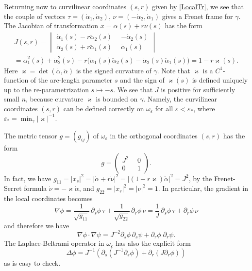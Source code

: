 \documentclass[reqno]{amsart}
\theoremstyle{plain}
\numberwithin{equation}{section}
\renewcommand{\kappa}{\varkappa}
\newcommand{\eps}{\varepsilon}
\begin{document}
Returning now to curvilinear coordinates $(s,r)$ given by \eqref{LocalTr},
we see that the couple of vectors
$ \tau=(\dot{\alpha}_1, \dot{\alpha}_2)$, $\nu=(-\dot{\alpha}_2, \dot{\alpha}_1)$
gives a Frenet frame for $\gamma$.
The Jacobian of transformation $x=\alpha(s)+r\nu(s)$ has the form
\begin{multline*}
J(s,r)=
\begin{vmatrix}
  \dot{\alpha}_1(s)-r\ddot{\alpha}_2(s)& -\dot{\alpha}_2(s)\\
          \dot{\alpha}_2(s)+r\ddot{\alpha}_1(s)\phantom{0} & \dot{\alpha}_1(s)
\end{vmatrix}
\\
=\dot{\alpha}_1^2(s)+\dot{\alpha}_2^2(s)
-r\big(\dot{\alpha}_1(s)\ddot{\alpha}_2(s)-
  \dot{\alpha}_2(s)\ddot{\alpha}_1(s)\big)=1-r \kappa(s).
\end{multline*}
Here $\kappa=\det(\dot{\alpha},\ddot{\alpha})$ is the signed curvature of $\gamma$. Note that $\kappa$ is a $C^1$-function
of the arc-length parameter $s$ and the sign of $\kappa(s)$ is defined uniquely up to the re-parametrization $s\mapsto-s$.
We see that $J$ is positive for sufficiently small $n$, because  curvature $\kappa$  is  bounded on $\gamma$.
Namely, the curvilinear coordinates $(s,r)$ can be defined correctly on  $\omega_\eps$ for all $\eps<\eps_*$, where
$\eps_*=\min_{\gamma}|\kappa|^{-1}$.

The metric tensor $g=(g_{ij})$ of $\omega_\eps$ in the orthogonal coordinates $(s,r)$  has the form
  \begin{equation*}
    g=
    \begin{pmatrix}
      J^2\phantom{0} & 0 \\
          0\phantom{0} & 1
    \end{pmatrix}.
  \end{equation*}
In fact, we have
$g_{11}=|x_s|^2=|\dot{\alpha}+r \dot{\nu}|^2
=|(1-r\kappa) \dot{\alpha}|^2=J^2$,
by the Frenet-Serret formula $\dot{\nu}=-\kappa \dot{\alpha}$, and $g_{22}=|x_r|^2=|\nu|^2=1$.
In particular,  the gradient in the local coordinates becomes
\begin{equation*}
 \nabla \phi=\frac1{\sqrt{g_{11}}}\,\partial_s\phi\, \tau+\frac1{\sqrt{g_{22}}}\,\partial_r\phi\, \nu=\frac1J\,\partial_s\phi\, \tau+\partial_r\phi\, \nu
\end{equation*}
and  therefore we have
\begin{equation}\label{ScalarProdGrads}
  \nabla \phi\cdot \nabla \psi=J^{-2}\partial_s\phi\, \partial_s \psi+
\partial_r \phi\; \partial_r \psi.
\end{equation}
The Laplace-Beltrami operator in $\omega_\eps$ has also the explicit form
\begin{equation}\label{LaplacianInSN}
\Delta \phi=J^{-1}\left(\partial_s(J^{-1}\partial_s \phi)+ \partial_r(J\partial_r \phi)\right)
\end{equation}
as is easy to check.
\end{document}
